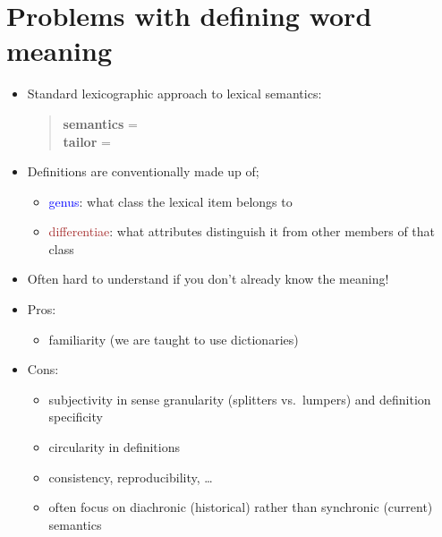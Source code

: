 \documentclass[headrule,footrule]{foils}
\begin{document}
\section{Problems with defining word meaning}





\begin{itemize}
\item Standard lexicographic approach to lexical semantics:
  \begin{quote}
    \textbf{semantics} = \\
    \textbf{tailor} = 
  \end{quote}
\item Definitions are conventionally made up of;
  \begin{itemize}
  \item \textcolor{blue}{genus}: what class the lexical item belongs to
  \item \textcolor{brown}{differentiae}: what attributes distinguish it from
  other members of that class
\end{itemize}
\item Often hard to understand if you don't already know the meaning!
\item Pros:
  \begin{itemize}
  \item familiarity (we are taught to use dictionaries)
  \end{itemize}
\item Cons:
  \begin{itemize}
  \item subjectivity in sense granularity (splitters vs.\ lumpers) and
    definition specificity
  \item circularity in definitions
  \item consistency, reproducibility, \ldots
  \item often focus on diachronic (historical) rather than synchronic (current) semantics 
  \end{itemize}
\end{itemize}
\end{document}
